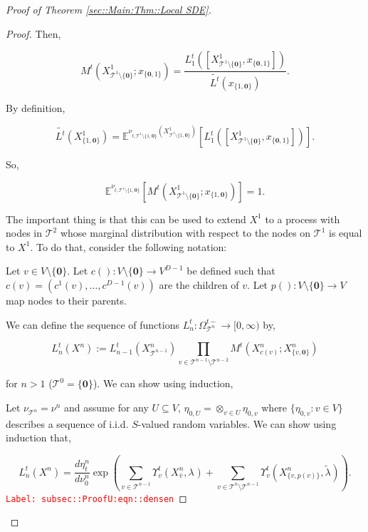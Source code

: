 \documentclass[12pt]{article}
\newcommand{\mb}{\mathbb}
\newcommand{\mc}{\mathcal}
\newcommand{\ra}{\rightarrow}
\newcommand{\ov}{\overline}
\newcommand{\tr}{\textcolor{red}}
\newcommand{\labe}[1]{\tr{\texttt{Label: #1}}}
\newcommand{\ind}{\hspace{24pt}}
\newcommand{\exmu}[2]{\mb{E}^{#1}\left[#2\right]}	%
\renewcommand{\root}{\mathbf{0}}				%
\renewcommand{\v}{v}							%
\renewcommand{\U}{U}							%
\newcommand{\cl}{\ov}							%
\renewcommand{\S}{S}							%
\newcommand{\OmegaV}[2]{\Omega_{#1}^{#2}}		%
\renewcommand{\t}{t}							%
\newcommand{\degr}{D}								%
\newcommand{\pup}[1]{^{#1}}							%
\newcommand{\tree}{\mc{T}}							%
\newcommand{\V}{V}									%
\newcommand{\numb}{n}								%
\newcommand{\xvts}[2]{x_{#1}{#2}}					%
\newcommand{\rxvtsn}[3]{X_{#1}^{#3}{#2}}			%
\newcommand{\mm}[3]{\nu_{#2#1}^{#3}}						%
\newcommand{\mmm}[3]{\eta_{#2#1}^{#3}}						%
\newcommand{\rate}[1]{\lambda_{#1}}					%
\newcommand{\crate}[2]{\alt{\lambda}_{#1}^{#2}}		%
\newcommand{\alt}{\widetilde}						%
\newcommand{\dense}[2]{L_{#1}^{#2}}				%
\newcommand{\cdense}[2]{M_{#1}^{#2}}			%
\newcommand{\ds}[2]{\Upsilon_{#1}^{#2}}			%
\renewcommand{\c}[1]{c(#1)}						%
\newcommand{\p}[1]{p(#1)}						%
\begin{document}
\begin{proof}[Proof of Theorem \ref{sec::Main:Thm::Local SDE}]
\begin{proof}
Then,

\[\cdense{}{\t}(\rxvtsn{\tree\pup{1}\setminus\{\root\}}{}{1};\xvts{\{\root,1\}}{}) = \frac{\dense{1}{\t}([\rxvtsn{\tree\pup{1}\setminus\{\root\}}{}{1},\xvts{\{\root,1\}}{}])}{\alt{\dense{}{\t}}(\xvts{\{1,\root\}}{})}.\]

By definition,

\[\alt{\dense{}{\t}}(\rxvtsn{\{1,\root\}}{}{1}) = \exmu{\mm{\tree\pup{1}\setminus\{1,\root\}}{\t,}{}(\rxvtsn{\tree\pup{1}\setminus\{1,\root\}}{}{1})}{\dense{1}{\t}([\rxvtsn{\tree\pup{1}\setminus\{\root\}}{}{1},\xvts{\{\root,1\}}{}])}.\]

So,

\[\exmu{\mm{\tree\pup{1}\setminus\{1,\root\}}{\t,}{}}{\cdense{}{\t}(\rxvtsn{\tree\pup{1}\setminus\{\root\}}{}{1};\xvts{\{1,\root\}}{})} = 1.\]

The important thing is that this can be used to extend \(\rxvtsn{}{}{1}\) to a process with nodes in \(\tree\pup{2}\) whose marginal distribution with respect to the nodes on \(\tree\pup{1}\) is equal to \(\rxvtsn{}{}{1}\). To do that, consider the following notation:

\ind Let \(\v \in \V\setminus\{\root\}\). Let \(\c{}:\V\setminus\{\root\} \ra \V^{\degr-1}\) be defined such that \(\c{\v} = (c^1(\v),\dots,c^{\degr-1}(\v))\) are the children of \(\v\). Let \(\p{}:\V\setminus\{\root\}\ra\V\) map nodes to their parents.

\ind We can define the sequence of functions \(\dense{\numb}{\t}: \OmegaV{\tree\pup{\numb}}{\t-} \ra [0,\infty)\) by,

\[\dense{\numb}{\t}(\rxvtsn{}{}{\numb}) := \dense{\numb-1}{\t}(\rxvtsn{\tree\pup{\numb-1}}{}{\numb})\prod_{\v\in \tree\pup{\numb-1}\setminus\tree\pup{\numb-2}} \cdense{}{\t}(\rxvtsn{\c{\v}}{}{\numb};\rxvtsn{\{\v,\root\}}{}{\numb})\]

for \(\numb > 1\) (\(\tree\pup{0} = \{\root\}\)). We can show using induction,

\ind Let \(\mm{\tree\pup{\numb}}{}{} = \mm{}{}{\numb}\) and assume for any \(\U \subseteq \V\), \(\mmm{\U}{0,}{} = \otimes_{\v\in\U}\mmm{\v}{0,}{}\) where \(\{\mmm{\v}{0,}{}:\v\in\V\}\) describes a sequence of i.i.d. \(\S\)-valued random variables. We can show using induction that,

\begin{equation}
\dense{\numb}{\t}(\rxvtsn{}{}{\numb}) = \frac{d\mmm{}{\t}{\numb}}{d\mm{}{0}{\numb}}\exp\left(\sum_{\v\in\tree\pup{\numb-1}}\ds{\v}{\t}(\rxvtsn{\cl{\v}}{}{\numb},\rate{}) + \sum_{\v\in\tree\pup{\numb}\setminus\tree\pup{\numb-1}} \ds{\v}{\t}(\rxvtsn{\{v,\p{\v}\}}{}{\numb},\crate{}{})\right).
\label{subsec::ProofU:eqn::densen}
\end{equation}
\labe{subsec::ProofU:eqn::densen}


\end{proof}
\end{proof}
\end{document}
